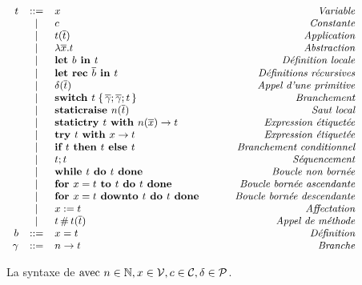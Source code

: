 \begin{figure}

\[\small
\begin{array}{rclr}
t
  & ::= & x & \qquad\textit{Variable} \\
  & |   & c & \qquad\textit{Constante} \\
  & |   & t (\overline{t}) & \qquad\textit{Application} \\
  & |   & \lambda \overline{x}. t & \qquad\textit{Abstraction} \\
  & |   & \textbf{let }b \textbf{ in } t & \qquad\textit{Définition locale} \\
  & |   & \textbf{let rec }\overline{b} \textbf{ in } t & \qquad\textit{Définitions récursives} \\
  & |   & \delta (\overline{t}) & \qquad\textit{Appel d'une primitive} \\
  & |   & \textbf{switch } t \;\{\, \overline{\gamma}; \overline{\gamma}; t \,\}
        & \qquad\textit{Branchement} \\
  & |   & \textbf{staticraise } n (\overline{t}) & \qquad\textit{Saut local} \\
  & |   & \textbf{statictry } t \textbf{ with } n (\overline{x}) \rightarrow t & \qquad\textit{Expression étiquetée} \\
  & |   & \textbf{try } t \textbf{ with } x \rightarrow t & \qquad\textit{Expression étiquetée} \\
  & |   & \textbf{if } t \textbf{ then } t \textbf{ else } t & \qquad\textit{Branchement conditionnel} \\
  & |   & t ; t & \qquad\textit{Séquencement} \\
  & |   & \textbf{while } t \textbf{ do } t \textbf{ done } & \qquad\textit{Boucle non bornée} \\
  & |   & \textbf{for } x = t \textbf{ to } t \textbf{ do } t \textbf{ done } & \qquad\textit{Boucle bornée ascendante} \\
  & |   & \textbf{for } x = t \textbf{ downto } t \textbf{ do } t \textbf{ done } & \qquad\textit{Boucle bornée descendante} \\
  & |   & x := t & \qquad\textit{Affectation} \\
  & |   & t \,\#\, t (\overline{t}) & \qquad\textit{Appel de méthode} \\
b & ::= & x = t & \qquad\textit{Définition} \\
\gamma  & ::= & n \rightarrow t & \qquad\textit{Branche} \\
\end{array}
\]
\caption{La syntaxe de {\LambdaCode}
$\textrm{avec }
n \in \mathbb{N},
x \in \mathcal{V},
c \in \mathcal{C},
\delta \in \mathcal{P}$.
}
\label{fig:lambda-syntax}
\end{figure}
